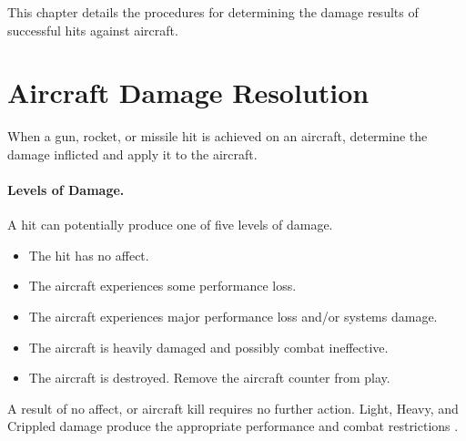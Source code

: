 
\label{rule:aircraft-damage}

This chapter details the procedures for determining the damage results of successful hits against aircraft.

\section{Aircraft Damage Resolution}
\label{rule:aircraft-damage-resolution}

When a gun, rocket, or missile hit is achieved on an aircraft, determine the damage inflicted and apply it to the aircraft.

\paragraph{Levels of Damage.} A hit can potentially produce one of five levels of damage.

\begin{itemize}

    \item{} The hit has no affect.

    \item{} The aircraft experiences some performance loss.
    
    \item{} The aircraft experiences major performance loss and/or systems damage.

    \item{} The aircraft is heavily damaged and possibly combat ineffective.
    
    \item{} The aircraft is destroyed. Remove the aircraft counter from play.

\end{itemize}

A result of no affect, or aircraft kill requires no further action. Light, Heavy, and Crippled damage produce the appropriate performance and combat restrictions .


